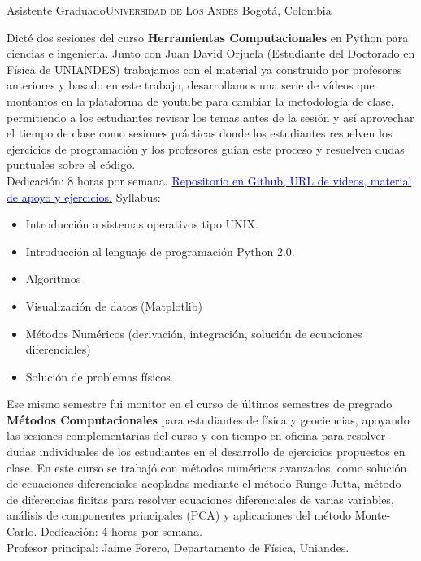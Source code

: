 \documentclass[12pt,letterpaper,sans]{moderncv}
\begin{document}
        {Asistente Graduado}{\textsc{Universidad de Los Andes}}
        {Bogot\'a, Colombia}{}
        { Dicté dos sesiones del curso \textbf{Herramientas Computacionales} en Python para ciencias e ingeniería.
          Junto con Juan David Orjuela (Estudiante del Doctorado en Física de UNIANDES) trabajamos con el
          material ya construido por profesores anteriores y basado en este trabajo, desarrollamos
          una serie de vídeos que montamos en la plataforma de youtube para cambiar la metodología de
          clase, permitiendo a los estudiantes revisar los temas antes de la sesión y así aprovechar
          el tiempo de clase como sesiones prácticas donde los estudiantes resuelven los ejercicios de
          programación y los profesores guían este proceso y resuelven dudas puntuales sobre el código.
          \\Dedicación: 8 horas por semana.
          \newline
          \href{https://github.com/ComputoCienciasUniandes/HerramientasComputacionales/tree/master/Lectures/98.Python}
               {\textcolor{blue}{Repositorio en Github, URL de videos, material de apoyo y ejercicios.}}
               \newline{}
               Syllabus:
               \begin{itemize}
               \item Introducción a sistemas operativos tipo UNIX.
               \item Introducción al lenguaje de programación Python 2.0.
               \item Algoritmos
               \item Visualización de datos (Matplotlib)
               \item Métodos Numéricos (derivación, integración, solución de ecuaciones diferenciales)
               \item Solución de problemas físicos.
               \end{itemize}
        Ese mismo semestre fui monitor en el curso de últimos semestres de pregrado
        \textbf{Métodos Computacionales} para estudiantes de física y geociencias, apoyando las
        sesiones complementarias del curso y con tiempo en oficina para resolver dudas individuales
        de los estudiantes en el desarrollo de ejercicios propuestos en clase. En este curso se
        trabajó con métodos numéricos avanzados, como solución de ecuaciones diferenciales acopladas
        mediante el método Runge-Jutta, método de diferencias finitas para resolver ecuaciones
        diferenciales de varias variables, análisis de componentes principales (PCA) y aplicaciones
        del método Monte-Carlo.
        Dedicación: 4 horas por semana.
        \\
        Profesor principal: Jaime Forero, Departamento de Física, Uniandes.
        }
\end{document}
